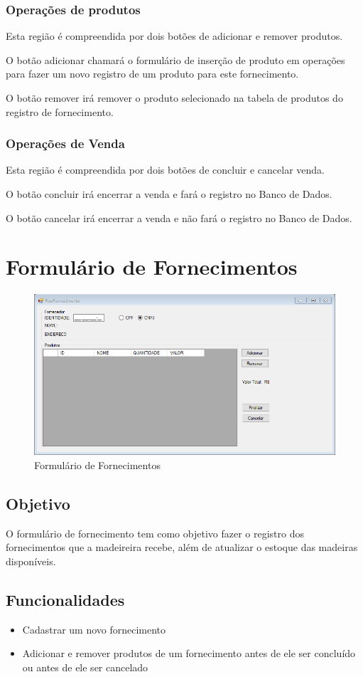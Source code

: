 \documentclass[
	article,			%
	12pt,				%
	oneside,			%
	a4paper,			%
	english,			%
	brazil,				%
	sumario=tradicional
	]{abntex2}
\begin{document}
	\subsubsection{Operações de produtos}
	Esta região é compreendida por dois botões de adicionar e remover produtos.
	
	O botão adicionar chamará o formulário de inserção de produto em operações para fazer um novo registro de um produto para este fornecimento.
	
	O botão remover irá remover o produto selecionado na tabela de produtos do registro de fornecimento.
	\subsubsection{Operações de Venda}
	Esta região é compreendida por dois botões de concluir e cancelar venda.
	
	O botão concluir irá encerrar a venda e fará o registro no Banco de Dados.
	
	O botão cancelar irá encerrar a venda e não fará o registro no Banco de Dados.
	\newpage
	\section{Formulário de Fornecimentos}
	\begin{figure}[!htb]
		\centering
		\includegraphics[scale=0.7]{../Figuras/FrmFornecimento.png}
		\caption{Formulário de Fornecimentos}
	\end{figure}
	\subsection{Objetivo}
	O formulário de fornecimento tem como objetivo fazer o registro dos fornecimentos que a madeireira recebe, além de atualizar o estoque das madeiras disponíveis.  
	\subsection{Funcionalidades}
		\begin{itemize}
		\item Cadastrar um novo fornecimento
		\item Adicionar e remover produtos de um fornecimento antes de ele ser concluído ou antes de ele ser cancelado 
	\end{itemize}
\end{document}
